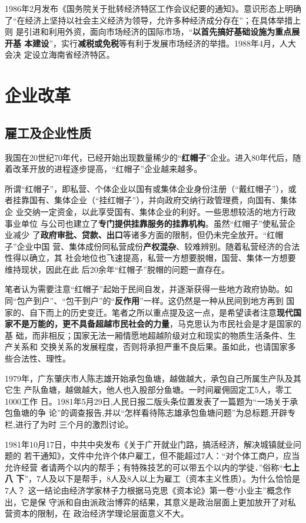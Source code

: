 1986年2月发布《国务院关于批转经济特区工作会议纪要的通知》。意识形态上明确
了“在经济上坚持以社会主义经济为领导，允许多种经济成分存在”；在具体举措上则
是引进和利用外资，面向市场经济的国际市场，“\textbf{以首先搞好基础设施为重点展开基
  本建设}”，实行\textbf{减税或免税}等有利于发展市场经济的举措。1988年4月，人大会决
定设立海南省经济特区。


\section{企业改革}

\subsection{雇工及企业性质}

我国在20世纪70年代，已经开始出现数量稀少的“\textbf{红帽子}”企业。进入80年代后，随
着改革开放的进程逐步提高，“红帽子”企业越来越多。

所谓“红帽子”，即私营、个体企业以国有或集体企业身份注册（“戴红帽子”），或
者挂靠国有、集体企业（“挂红帽子”），并向政府交纳行政管理费，向国有、集体企
业交纳一定资金，以此享受国有、集体企业的利好。一些思想较活的地方行政事业单位
与公司也建立了\textbf{专门提供挂靠服务的挂靠机构}。虽然“红帽子”使私营企业减少
了\textbf{政府审批、贷款、出口}等诸多方面的限制，但仍未完全放开。“红帽子”企业中国
营、集体成份同私营成份\textbf{产权混杂}、较难辨别。随着私营经济的合法性得以确立，其
社会地位也飞速提高，私营一方想要脱帽，国营、集体一方想要维持现状，因此在此
后20余年“红帽子”脱帽的问题一直存在。

笔者认为需要注意“红帽子”起始于民间自发，并逐渐获得一些地方政府协助。如
同“包产到户”、“包干到户”的“\textbf{反作用}”一样。这仍然是一种从民间到地方再到
国家的、自下而上的历史变迁。笔者之所以重点提及这一点，是希望读者注意\textbf{现代国
  家不是万能的，更不具备超越市民社会的力量}，马克思认为市民社会是才是国家的基
础，而非相反；国家无法一厢情愿地超越阶级对立和现实的物质生活条件、生产关系和
交换关系的发展程度，否则将承担严重不良后果。虽如此，也请国家多些合法性、理性。


1979年，广东肇庆市人陈志雄开始承包鱼塘，越做越大，承包自己所属生产队及其它生
产队鱼塘，越做越大，他人也入股部分鱼塘。一时间雇佣固定工5人，零工1000工作
日。1981年5月29日,人民日报二版头条位置发表了一篇题为“一场关于承包鱼塘的争
论”的调查报告,并以“怎样看待陈志雄承包鱼塘问题”为总标题,开辟专栏,进行了为时
三个月的激烈讨论。

1981年10月17日，中共中央发布《关于广开就业门路，搞活经济，解决城镇就业问题的
若干通知》，文件中允许个体户雇工，但不能超过7人：“对个体工商户，应当允许经营
者请两个以内的帮手；有特殊技艺的可以带五个以内的学徒．”俗称“\textbf{七上八
  下}”，7人及以下是帮手，8人及8人以上为雇工（资本主义性质）。为什么恰恰是7人？
这一结论由经济学家林子力根据马克思《资本论》第一卷“小业主”概念作出，它是保
守派和自由派政治博弈的结果，其意义是政治层面上更加放开了对私营资本的限制，在
政治经济学理论层面意义不大。

